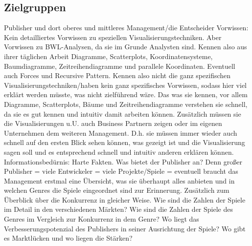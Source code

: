\documentclass[usegeometry=true]{scrartcl}
\begin{document}
\subsection{Zielgruppen}
Publisher und dort oberes und mittleres Management/die Entscheider
Vorwissen: Kein detailliertes Vorwissen zu speziellen Visualisierungstechniken. Aber Vorwissen zu BWL-Analysen, da sie im Grunde Analysten sind. Kennen also aus ihrer täglichen Arbeit Diagramme, Scatterplots, Koordinatensysteme, Baumdiagramme, Zeitreihendiagramme und parallele Koordinaten. Eventuell auch Forces und Recursive Pattern. Kennen also nicht die ganz spezifischen Visualisierungstechniken/haben kein ganz spezifisches Vorwissen, sodass hier viel erklärt werden müsste, was nicht zielführend wäre. Das was sie kennen, vor allem Diagramme, Scatterplots, Bäume und Zeitreihendiagramme verstehen sie schnell, da sie es gut kennen und intuitiv damit arbeiten können. 
Zusätzlich müssen sie die Visualisierungen u.U. auch Business Partnern zeigen oder im eigenen Unternehmen dem weiteren Management. D.h. sie müssen immer wieder auch schnell auf den ersten Blick sehen können, was gezeigt ist und die Visualisierung sagen soll und es entsprechend schnell und intuitiv anderen erklären können. 
Informationsbedürnis: Harte Fakten. Was bietet der Publisher an? Denn großer Publisher = viele Entwickeler = viele Projekte/Spiele = eventuell braucht das Management erstmal eine Übersicht, was sie überhaupt alles anbieten und in welchen Genres die Spiele eingeordnet sind zur Erinnerung. Zusätzlich zum Überblick über die Konkurrenz in gleicher Weise. Wie sind die Zahlen der Spiele im Detail in den verschiedenen Märkten? Wie sind die Zahlen der Spiele des Genres im Vergleich zur Konkurrenz in dem Genre? Wo liegt das Verbesserungspotenzial des Publishers in seiner Ausrichtung der Spiele? Wo gibt es Marktlücken und wo liegen die Stärken? 

\end{document}
